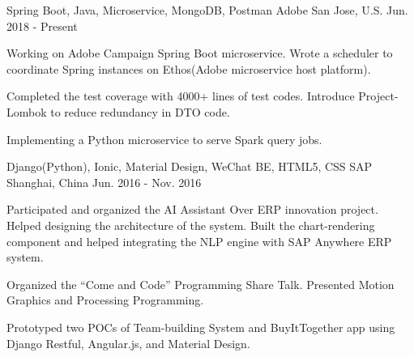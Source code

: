 


\begin{cventries}


\cventry
{Spring Boot, Java, Microservice, MongoDB, Postman} %
{Adobe} %
{San Jose, U.S.} %
{Jun. 2018 - Present} %
{ %
\begin{cvitems}
\item {Working on Adobe Campaign Spring Boot microservice. Wrote a scheduler to coordinate Spring instances on Ethos(Adobe microservice host platform).}
\item {Completed the test coverage with 4000+ lines of test codes. Introduce Project-Lombok to reduce redundancy in DTO code.}
\item {Implementing a Python microservice to serve Spark query jobs.}
\end{cvitems}
}


\cventry
{Django(Python), Ionic, Material Design, WeChat BE, HTML5, CSS} %
{SAP} %
{Shanghai, China} %
{Jun. 2016 - Nov. 2016} %
{ %
\begin{cvitems}
\item {Participated and organized the AI Assistant Over ERP innovation project. Helped designing the architecture of the system. Built the chart-rendering component and helped integrating the NLP engine with SAP Anywhere ERP system.}
\item {Organized the “Come and Code” Programming Share Talk. Presented Motion Graphics and Processing Programming.}
\item {Prototyped two POCs of Team-building System and BuyItTogether app using Django Restful, Angular.js, and Material Design.}
\end{cvitems}
}


\end{cventries}
